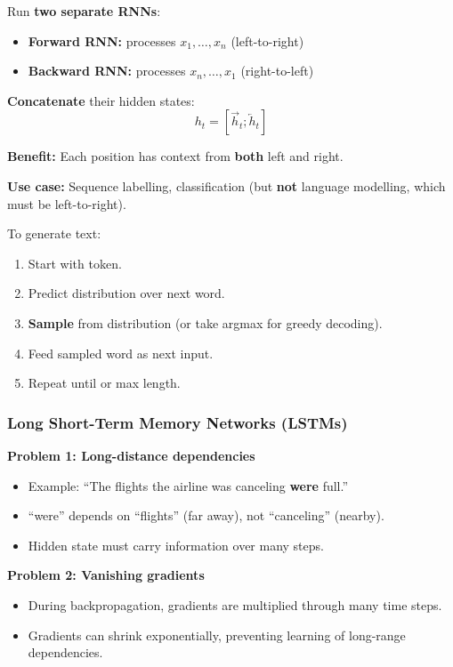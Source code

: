\begin{defbox}
Run \textbf{two separate RNNs}:
\begin{itemize}
  \item \textbf{Forward RNN:} processes $x_1, \ldots, x_n$ (left-to-right)
  \item \textbf{Backward RNN:} processes $x_n, \ldots, x_1$ (right-to-left)
\end{itemize}

\textbf{Concatenate} their hidden states:
\[
h_t = [\overrightarrow{h}_t ; \overleftarrow{h}_t]
\]

\textbf{Benefit:} Each position has context from \textbf{both} left and right.

\textbf{Use case:} Sequence labelling, classification (but \textbf{not} language modelling, which must be left-to-right).
\end{defbox}

\begin{exbox}
To generate text:
\begin{enumerate}
  \item Start with  token.
  \item Predict distribution over next word.
  \item \textbf{Sample} from distribution (or take argmax for greedy decoding).
  \item Feed sampled word as next input.
  \item Repeat until  or max length.
\end{enumerate}
\end{exbox}

\bigseparator

\subsubsection{Long Short-Term Memory Networks (LSTMs)}

\begin{tipbox}
\textbf{Problem 1: Long-distance dependencies}
\begin{itemize}
  \item Example: ``The flights the airline was canceling \textbf{were} full.''
  \item ``were'' depends on ``flights'' (far away), not ``canceling'' (nearby).
  \item Hidden state must carry information over many steps.
\end{itemize}

\textbf{Problem 2: Vanishing gradients}
\begin{itemize}
  \item During backpropagation, gradients are multiplied through many time steps.
  \item Gradients can shrink exponentially, preventing learning of long-range dependencies.
\end{itemize}
\end{tipbox}


